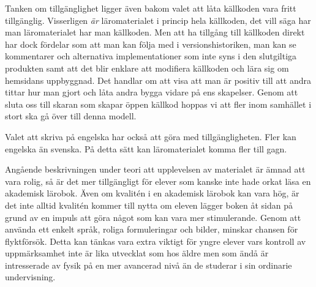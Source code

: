 Tanken om tillgänglighet ligger även bakom valet att låta källkoden vara fritt
tillgänglig. Visserligen \textit{är} läromaterialet i princip hela källkoden, det vill säga
har man läromaterialet har man källkoden. Men att ha tillgång till källkoden
direkt har dock fördelar som att man kan följa med i versionshistoriken, man kan
se kommentarer och alternativa implementationer som inte syns i den slutgiltiga
produkten samt att det blir enklare att modifiera källkoden och lära sig om
hemsidans uppbyggnad.  Det handlar om att visa att man är positiv till att andra
tittar hur man gjort och låta andra bygga vidare på ens skapelser. Genom att
sluta oss till skaran som skapar öppen källkod hoppas vi att fler inom samhället
i stort ska gå över till denna modell.

Valet att skriva på engelska har också att göra med tillgängligheten. Fler kan
engelska än svenska. På detta sätt kan läromaterialet komma fler till gagn.

Angående beskrivningen under teori att upplevelsen av materialet är ämnad att
vara rolig, så är det mer tillgängligt för elever som kanske inte hade orkat
läsa en akademisk lärobok. Även om kvalitén i en akademisk lärobok kan vara hög,
är det inte alltid kvalitén kommer till nytta om eleven lägger boken åt sidan på
grund av en impuls att göra något som kan vara mer stimulerande.  Genom att
använda ett enkelt språk, roliga formuleringar och bilder, minskar chansen för
flyktförsök. Detta kan tänkas vara extra viktigt för yngre elever vars kontroll
av uppmärksamhet inte är lika utvecklat som hos äldre men som ändå är
intresserade av fysik på en mer avancerad nivå än de studerar i sin ordinarie
undervisning.
